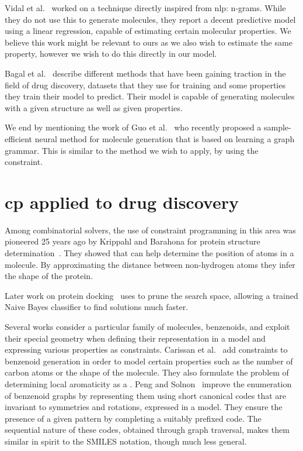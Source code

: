 \documentclass[../Document.tex]{subfiles}
\begin{document}
Vidal et al.~\cite{lingos} worked on a technique directly inspired from \gls{nlp}: n-grams. While they do not use this to generate molecules, they report a decent predictive model using a linear regression, capable of estimating certain molecular properties. We believe this work might be relevant to ours as we also wish to estimate the same property, however we wish to do this directly in our \cp model.

Bagal et al.~\cite{bagal_molgpt_2022} describe different methods that have been gaining traction in the field of drug discovery, datasets that they use for training and some properties they train their model to predict. Their model is capable of generating molecules with a given structure as well as given properties.

We end by mentioning the work of Guo et al.~\cite{guo2022dataefficient} who recently proposed a sample-efficient neural method for molecule generation that is based on learning a graph grammar. This is similar to the method we wish to apply, by using the \grammar constraint.


\section{\acrshort{cp} applied to drug discovery}
\label{sec:lit-review/cp}
Among combinatorial solvers, the use of constraint programming in this area was pioneered 25 years ago by Krippahl and Barahona for protein structure determination~\cite{DBLP:conf/cp/KrippahlB99}.
They showed that \cp can help determine the position of atoms in a molecule.
By approximating the distance between non-hydrogen atoms they infer the shape of the protein.

Later work on protein docking~\cite{DBLP:journals/almob/KrippahlB15} uses \cp to prune the search space, allowing a trained Naive Bayes classifier to find solutions much faster.

Several works consider a particular family of molecules, benzenoids, and exploit their special geometry when defining their representation in a \cp model and expressing various properties as constraints.
Carissan et al.~\cite{DBLP:journals/constraints/CarissanHPTV22,DBLP:journals/jcisd/VaretPTHC22} add constraints to benzenoid generation in order to model certain properties such as the number of carbon atoms or the shape of the molecule.
They also formulate the problem of determining local aromaticity as a \csp.
Peng and Solnon~\cite{DBLP:conf/cp/PengS23} improve the enumeration of benzenoid graphs by representing them using short canonical codes that are invariant to symmetries and rotations, expressed in a \cp model.
They ensure the presence of a given pattern by completing a suitably prefixed code.
The sequential nature of these codes, obtained through graph traversal, makes them similar in spirit to the SMILES notation, though much less general.
\end{document}
